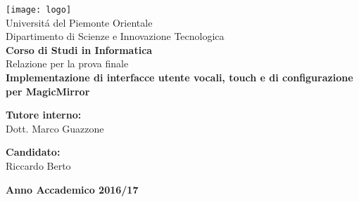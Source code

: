 \begin{titlepage}
\begin{center}
\texttt{[image: logo]}
\\[1\baselineskip]
\Large Universit\'a del Piemonte Orientale
\\[2\baselineskip]
\Large Dipartimento di Scienze e Innovazione Tecnologica
\\[1\baselineskip]
\textbf{\Large Corso di Studi in Informatica}
\\[2\baselineskip]
\normalsize Relazione per la prova finale
\\[1\baselineskip]

{\LARGE \bfseries Implementazione di interfacce utente vocali, touch e di configurazione per MagicMirror}\\[1cm]
\vspace{1cm}
\begin{minipage}[t]{0.4\textwidth}
\flushleft
{\bf Tutore interno:}\\
Dott. Marco Guazzone\\
\end{minipage}
\begin{minipage}[t]{0.4\textwidth}
\flushright
{\bf Candidato:}\\
Riccardo Berto\\
\end{minipage}
\vfill
\vspace{1cm}
\textbf{\large Anno Accademico 2016/17}
\vfill
\end{center}
\end{titlepage}
